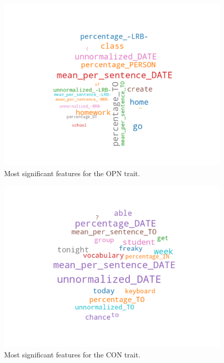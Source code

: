 \documentclass[10pt, a4paper]{article}
\begin{document}
\begin{figure}
\begin{center}
  \includegraphics[width=\columnwidth]{figures/cOPN.png}
  \caption{Most significant features for the OPN trait.}
  \label{fig:figure3}
\end{center}
\end{figure}

\begin{figure}
\begin{center}
  \includegraphics[width=\columnwidth]{figures/cCON.png}
  \caption{Most significant features for the CON trait.}
  \label{fig:figure4}
\end{center}
\end{figure}
\end{document}
